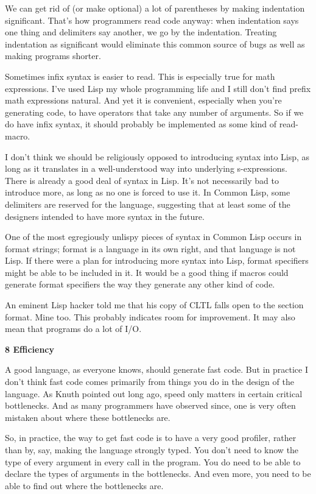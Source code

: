 \documentclass[12pt]{book}
\begin{document}
We can get rid of (or make optional) a lot of parentheses by making
indentation significant. That's how programmers read code anyway: when
indentation says one thing and delimiters say another, we go by the
indentation. Treating indentation as significant would eliminate this
common source of bugs as well as making programs shorter.

Sometimes infix syntax is easier to read. This is especially true for
math expressions. I've used Lisp my whole programming life and I still
don't find prefix math expressions natural. And yet it is convenient,
especially when you're generating code, to have operators that take any
number of arguments. So if we do have infix syntax, it should probably
be implemented as some kind of read-macro.

I don't think we should be religiously opposed to introducing syntax
into Lisp, as long as it translates in a well-understood way into
underlying s-expressions. There is already a good deal of syntax in
Lisp. It's not necessarily bad to introduce more, as long as no one is
forced to use it. In Common Lisp, some delimiters are reserved for the
language, suggesting that at least some of the designers intended to
have more syntax in the future.

One of the most egregiously unlispy pieces of syntax in Common Lisp
occurs in format strings; format is a language in its own right, and
that language is not Lisp. If there were a plan for introducing more
syntax into Lisp, format specifiers might be able to be included in it.
It would be a good thing if macros could generate format specifiers the
way they generate any other kind of code.

An eminent Lisp hacker told me that his copy of CLTL falls open to the
section format. Mine too. This probably indicates room for improvement.
It may also mean that programs do a lot of I/O.

\textbf{8 Efficiency}

A good language, as everyone knows, should generate fast code. But in
practice I don't think fast code comes primarily from things you do in
the design of the language. As Knuth pointed out long ago, speed only
matters in certain critical bottlenecks. And as many programmers have
observed since, one is very often mistaken about where these bottlenecks
are.

So, in practice, the way to get fast code is to have a very good
profiler, rather than by, say, making the language strongly typed. You
don't need to know the type of every argument in every call in the
program. You do need to be able to declare the types of arguments in the
bottlenecks. And even more, you need to be able to find out where the
bottlenecks are.
\end{document}
